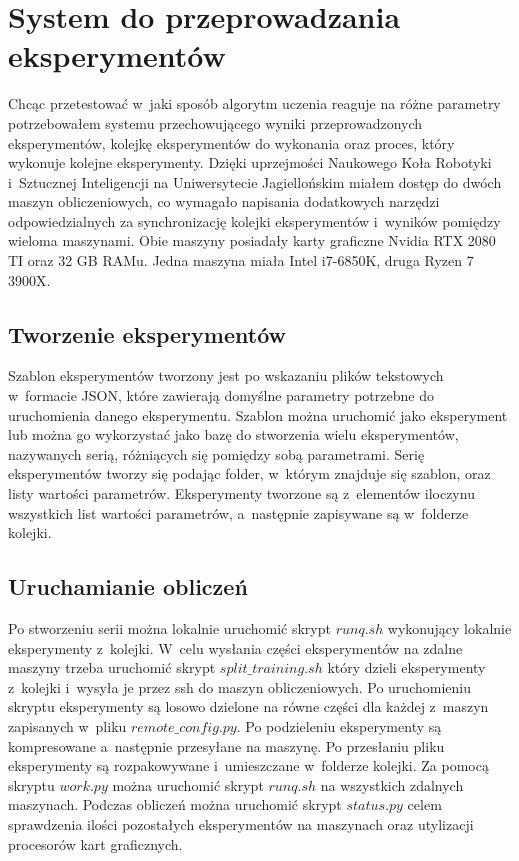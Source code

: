\documentclass[12pt, oneside]{article}
\begin{document}
\section{System do przeprowadzania eksperymentów}
Chcąc przetestować w~jaki sposób algorytm uczenia reaguje na różne parametry potrzebowałem systemu przechowującego wyniki przeprowadzonych eksperymentów, kolejkę eksperymentów do wykonania oraz proces, który wykonuje kolejne eksperymenty. Dzięki uprzejmości Naukowego Koła Robotyki i~Sztucznej Inteligencji na Uniwersytecie Jagiellońskim miałem dostęp do dwóch maszyn obliczeniowych, co wymagało napisania dodatkowych narzędzi odpowiedzialnych za synchronizację kolejki eksperymentów i~wyników pomiędzy wieloma maszynami. Obie maszyny posiadały karty graficzne Nvidia RTX 2080 TI oraz 32 GB RAMu. Jedna maszyna miała Intel i7-6850K, druga Ryzen 7 3900X.

\subsection{Tworzenie eksperymentów}
Szablon eksperymentów tworzony jest po wskazaniu plików tekstowych w~formacie JSON, które zawierają domyślne parametry potrzebne do uruchomienia danego eksperymentu. Szablon można uruchomić jako eksperyment lub można go wykorzystać jako bazę do stworzenia wielu eksperymentów, nazywanych serią, różniących się pomiędzy sobą parametrami. Serię eksperymentów tworzy się podając folder, w~którym znajduje się szablon, oraz listy wartości parametrów. Eksperymenty tworzone są z~elementów iloczynu wszystkich list wartości parametrów, a~następnie zapisywane są w~folderze kolejki.

\subsection{Uruchamianie obliczeń}
Po stworzeniu serii można lokalnie uruchomić skrypt $runq.sh$ wykonujący lokalnie eksperymenty z~kolejki. W~celu wysłania części eksperymentów na zdalne maszyny trzeba uruchomić skrypt $split\_training.sh$ który dzieli eksperymenty z~kolejki i~wysyła je przez ssh do maszyn obliczeniowych. Po uruchomieniu skryptu eksperymenty są losowo dzielone na równe części dla każdej z~maszyn zapisanych w~pliku $remote\_config.py$. Po podzieleniu eksperymenty są kompresowane a~następnie przesyłane na maszynę. Po przesłaniu pliku eksperymenty są rozpakowywane i~umieszczane w~folderze kolejki. Za pomocą skryptu $work.py$ można uruchomić skrypt $runq.sh$ na wszystkich zdalnych maszynach. Podczas obliczeń można uruchomić skrypt $status.py$ celem sprawdzenia ilości pozostałych eksperymentów na maszynach oraz utylizacji procesorów kart graficznych.
\end{document}
